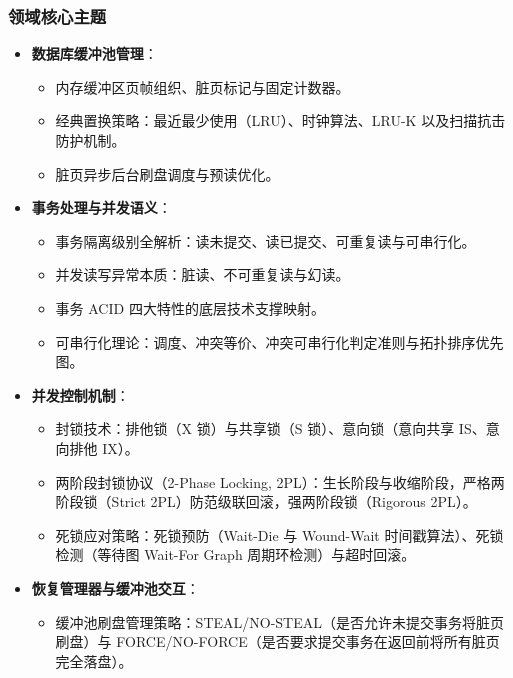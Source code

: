 \subsubsection{领域核心主题}
\begin{itemize}
    \item \textbf{数据库缓冲池管理}：
    \begin{itemize}
        \item 内存缓冲区页帧组织、脏页标记与固定计数器。
        \item 经典置换策略：最近最少使用（LRU）、时钟算法、LRU-K 以及扫描抗击防护机制。
        \item 脏页异步后台刷盘调度与预读优化。
    \end{itemize}
    \item \textbf{事务处理与并发语义}：
    \begin{itemize}
        \item 事务隔离级别全解析：读未提交、读已提交、可重复读与可串行化。
        \item 并发读写异常本质：脏读、不可重复读与幻读。
        \item 事务 ACID 四大特性的底层技术支撑映射。
        \item 可串行化理论：调度、冲突等价、冲突可串行化判定准则与拓扑排序优先图。
    \end{itemize}
    \item \textbf{并发控制机制}：
    \begin{itemize}
        \item 封锁技术：排他锁（X 锁）与共享锁（S 锁）、意向锁（意向共享 IS、意向排他 IX）。
        \item 两阶段封锁协议（2-Phase Locking, 2PL）：生长阶段与收缩阶段，严格两阶段锁（Strict 2PL）防范级联回滚，强两阶段锁（Rigorous 2PL）。
        \item 死锁应对策略：死锁预防（Wait-Die 与 Wound-Wait 时间戳算法）、死锁检测（等待图 Wait-For Graph 周期环检测）与超时回滚。
    \end{itemize}
    \item \textbf{恢复管理器与缓冲池交互}：
    \begin{itemize}
        \item 缓冲池刷盘管理策略：STEAL/NO-STEAL（是否允许未提交事务将脏页刷盘）与 FORCE/NO-FORCE（是否要求提交事务在返回前将所有脏页完全落盘）。
    \end{itemize}
\end{itemize}

